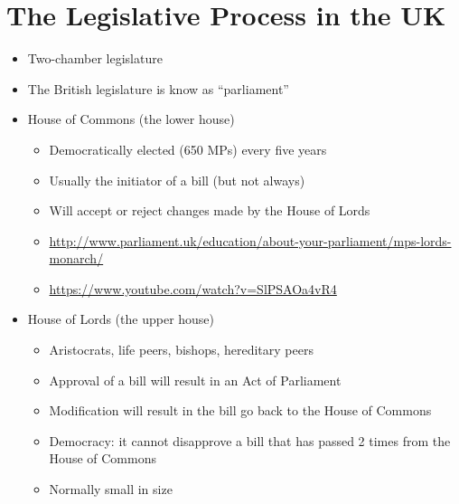\documentclass{article}
\begin{document}
\section{The Legislative Process in the UK}
\begin{itemize}
\item Two-chamber legislature
\item The British  legislature is know as ``parliament''
\item House of Commons (the lower house)
\begin{itemize}
\item Democratically elected (650 MPs) every five years
\item Usually the initiator of a bill (but not always)
\item Will accept or reject changes made by the House of Lords
\item \url{http://www.parliament.uk/education/about-your-parliament/mps-lords-monarch/}
\item \url{https://www.youtube.com/watch?v=SlPSAOa4vR4}
\end{itemize}
\item House of Lords (the upper house)
\begin{itemize}
\item Aristocrats, life peers, bishops, hereditary peers
\item Approval of a bill will result in an Act of Parliament
\item Modification will result in the bill go back to the House of Commons
\item Democracy: it cannot disapprove a bill that has passed 2 times from the House of Commons
\item Normally small in size
\end{itemize}
\end{itemize}
\end{document}
